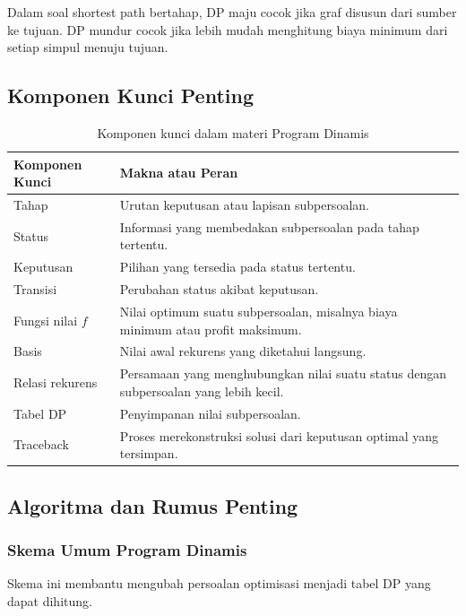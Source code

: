 Dalam soal shortest path bertahap, DP maju cocok jika graf disusun dari sumber ke tujuan. DP mundur cocok jika lebih mudah menghitung biaya minimum dari setiap simpul menuju tujuan.

\subsection{Komponen Kunci Penting}

\begin{table}[H]
\centering
\begin{tabularx}{\textwidth}{|L{0.28\textwidth}|X|}
\hline
\textbf{Komponen Kunci} & \textbf{Makna atau Peran} \\
\hline
Tahap & Urutan keputusan atau lapisan subpersoalan. \\
\hline
Status & Informasi yang membedakan subpersoalan pada tahap tertentu. \\
\hline
Keputusan & Pilihan yang tersedia pada status tertentu. \\
\hline
Transisi & Perubahan status akibat keputusan. \\
\hline
Fungsi nilai $f$ & Nilai optimum suatu subpersoalan, misalnya biaya minimum atau profit maksimum. \\
\hline
Basis & Nilai awal rekurens yang diketahui langsung. \\
\hline
Relasi rekurens & Persamaan yang menghubungkan nilai suatu status dengan subpersoalan yang lebih kecil. \\
\hline
Tabel DP & Penyimpanan nilai subpersoalan. \\
\hline
Traceback & Proses merekonstruksi solusi dari keputusan optimal yang tersimpan. \\
\hline
\end{tabularx}
\caption{Komponen kunci dalam materi Program Dinamis}
\label{tab:komponen-kunci-program-dinamis}
\end{table}

\subsection{Algoritma dan Rumus Penting}

\subsubsection{Skema Umum Program Dinamis}

\begin{jawab}
Skema ini membantu mengubah persoalan optimisasi menjadi tabel DP yang dapat dihitung.
\end{jawab}


